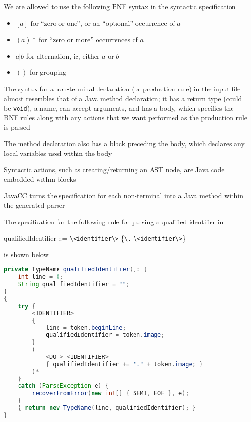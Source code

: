 \documentclass[8pt,a4paper,compress,handout]{beamer}
\newenvironment{spaced}
{
\smallskip
\hspace{.5cm}
\begin{minipage}[c]{\textwidth}
}
{
\end{minipage}
\smallskip
}
\begin{document}
\begin{frame}[fragile]
\pause

We are allowed to use the following BNF syntax in the syntactic specification
\begin{itemize}
\item $[a]$ for ``zero or one'', or an ``optional'' occurrence of $a$
\item $(a)*$ for ``zero or more'' occurrences of $a$
\item $a | b$ for alternation, ie, either $a$ or $b$
\item $()$ for grouping
\end{itemize}

\pause
\bigskip

The syntax for a non-terminal declaration (or production rule) in the input file almost resembles that of a Java method declaration; it has a return type (could be \lstinline{void}), a name, can accept arguments, and has a body, which specifies the BNF rules along with any actions that we want performed as the production rule is parsed

\pause
\bigskip

The method declaration also has a block preceding the body, which declares any local variables used within the body

\pause
\bigskip

Syntactic actions, such as creating/returning an AST node, are Java code embedded within blocks

\pause
\bigskip

JavaCC turns the specification for each non-terminal into a Java method within the generated parser
\end{frame}

\begin{frame}[fragile]
\pause

The specification for the following rule for parsing a qualified identifier in \jmm

\text{ }
\begin{spaced}
\begin{production}
qualifiedIdentifier ::= \lstinline{\<identifier\>} \{\lstinline{\.} \lstinline{\<identifier\>}\}
\end{production}
\end{spaced}

\noindent is shown below

\begin{lstlisting}[language=Java]
private TypeName qualifiedIdentifier(): {
    int line = 0;
    String qualifiedIdentifier = "";
}
{
    try {
        <IDENTIFIER>
        {
            line = token.beginLine;
            qualifiedIdentifier = token.image;
        }
        (
            <DOT> <IDENTIFIER>
            { qualifiedIdentifier += "." + token.image; }
        )*
    }
    catch (ParseException e) {
        recoverFromError(new int[] { SEMI, EOF }, e);
    }
    { return new TypeName(line, qualifiedIdentifier); }
}
\end{lstlisting}
\end{frame}
\end{document}
